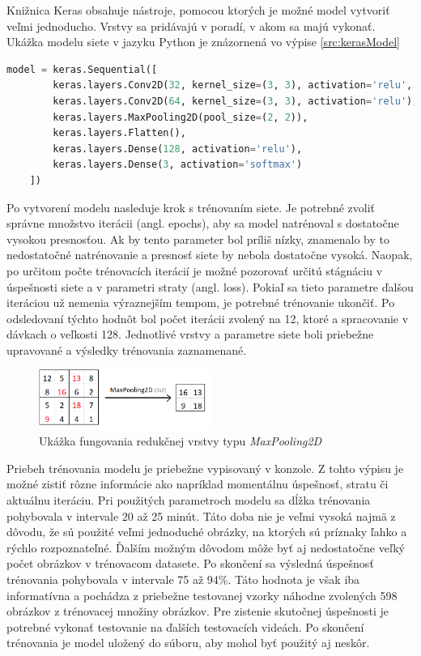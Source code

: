 \documentclass[slovak,master,dept460,male,cpp,cpdeclaration]{diploma}
\begin{document}
Knižnica Keras obsahuje nástroje, pomocou ktorých je možné model vytvoriť veľmi jednoducho. Vrstvy sa pridávajú v poradí, v akom sa majú vykonať. Ukážka modelu siete v jazyku Python je znázornená vo výpise \ref{src:kerasModel}

\newpage
\begin{lstlisting}[language=Python,label=src:kerasModel,caption={Vrstvy neurónovej siete}]
    model = keras.Sequential([
        keras.layers.Conv2D(32, kernel_size=(3, 3), activation='relu', input_shape=(size, size, 1)),
        keras.layers.Conv2D(64, kernel_size=(3, 3), activation='relu'),
        keras.layers.MaxPooling2D(pool_size=(2, 2)),
        keras.layers.Flatten(),
        keras.layers.Dense(128, activation='relu'),
        keras.layers.Dense(3, activation='softmax')
    ])
\end{lstlisting}

Po vytvorení modelu nasleduje krok s trénovaním siete. Je potrebné zvoliť  správne množstvo iterácii (angl. epochs), aby sa model natrénoval s dostatočne vysokou presnosťou. Ak by tento parameter bol príliš nízky, znamenalo by to nedostatočné natrénovanie a presnosť siete by nebola dostatočne vysoká. Naopak, po určitom počte trénovacích iterácií je možné pozorovať určitú stágnáciu v úspešnosti siete a v  parametri straty (angl. loss).  Pokiaľ sa  tieto parametre ďalšou iteráciou už nemenia výraznejším tempom, je potrebné trénovanie ukončiť. Po odsledovaní týchto hodnôt bol počet iterácii zvolený na 12, ktoré a spracovanie v dávkach o veľkosti 128. Jednotlivé vrstvy a parametre siete boli priebežne upravované a výsledky trénovania zaznamenané.

\begin{figure}[H]
	\centering
	\includegraphics[width=0.5\textwidth]{Figures/pooling.png}
	\caption{Ukážka fungovania redukčnej vrstvy typu \textit{MaxPooling2D}}
	\label{fig:pooling}
\end{figure}

Priebeh trénovania modelu je priebežne vypisovaný v konzole. Z tohto výpisu je možné zistiť rôzne informácie ako napríklad momentálnu úspešnosť, stratu či aktuálnu iteráciu.  Pri použitých parametroch modelu sa dĺžka trénovania pohybovala v intervale 20 až 25 minút. Táto doba nie je veľmi vysoká najmä z dôvodu, že sú použité veľmi jednoduché obrázky, na ktorých sú príznaky ľahko a rýchlo rozpoznateľné. Ďalším možným dôvodom môže byť aj nedostatočne veľký počet obrázkov v trénovacom datasete. Po skončení sa  výsledná úspešnosť  trénovania pohybovala v intervale 75 až 94\%. Táto hodnota je však iba informatívna a pochádza z priebežne testovanej vzorky náhodne zvolených 598 obrázkov z trénovacej množiny obrázkov. Pre zistenie skutočnej úspešnosti je potrebné vykonať testovanie na ďalších testovacích videách. Po skončení trénovania je model uložený do  súboru, aby mohol byť  použitý aj neskôr. 
\end{document}
